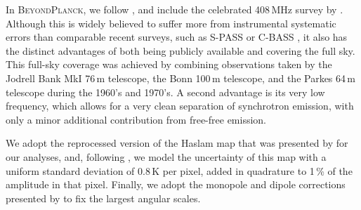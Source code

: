 \documentclass[twocolumn]{aa}
\newcommand{\BP}{\textsc{BeyondPlanck}}
\begin{document}
In \BP, we follow \citet{planck2014-a12}, and include the celebrated
408\,MHz survey by \citet{haslam1982}. Although this is widely
believed to suffer more from instrumental systematic errors than
comparable recent surveys, such as S-PASS \citep{Carretti:2019} or
C-BASS \citep{king2014}, it also has the distinct advantages of both
being publicly available and covering the full sky. This full-sky
coverage was achieved by combining observations taken by the Jodrell
Bank MkI 76\,m telescope, the Bonn 100\,m telescope, and the Parkes
64\,m telescope during the 1960's and 1970's. A second advantage is
its very low frequency, which allows for a very clean separation of
synchrotron emission, with only a minor additional contribution from
free-free emission.

We adopt the reprocessed version of the Haslam map that was presented
by \citet{remazeilles2014} for our analyses, and, following
\citet{planck2014-a12}, we model the uncertainty of this map with a
uniform standard deviation of 0.8\,K per pixel, added in quadrature to
1\,\% of the amplitude in that pixel. Finally, we adopt the monopole and
dipole corrections presented by \citet{wehus2014} to fix the largest
angular scales.

\end{document}
